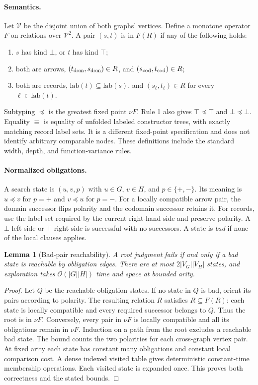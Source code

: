 \documentclass[11pt,letterpaper]{article}
\newtheorem{lemma}[theorem]{Lemma}
\theoremstyle{definition}\newtheorem{definition}[theorem]{Definition}
\newcommand{\Sub}{\ensuremath{\preceq}}
\newcommand{\eqt}{\ensuremath{\equiv}}
\newcommand{\size}[1]{\lvert#1\rvert}
\newcommand{\Oh}{\mathcal O}
\begin{document}
\paragraph{Semantics.}
Let $\mathcal V$ be the disjoint union of both graphs' vertices. Define a monotone operator $F$ on relations over $\mathcal V^2$. A pair $(s,t)$ is in $F(R)$ if any of the following holds:
\begin{enumerate}
\item $s$ has kind $\bot$, or $t$ has kind $\top$;
\item both are arrows, $(t_{\rm dom},s_{\rm dom})\in R$, and $(s_{\rm cod},t_{\rm cod})\in R$;
\item both are records, $\mathrm{lab}(t)\subseteq\mathrm{lab}(s)$, and $(s_\ell,t_\ell)\in R$ for every $\ell\in\mathrm{lab}(t)$.
\end{enumerate}
Subtyping $\Sub$ is the greatest fixed point $\nu F$. Rule 1 also gives $\top\Sub\top$ and $\bot\Sub\bot$. Equality $\eqt$ is equality of unfolded labeled constructor trees, with exactly matching record label sets. It is a different fixed-point specification and does not identify arbitrary comparable nodes. These definitions include the standard width, depth, and function-variance rules.

\paragraph{Normalized obligations.}
A search state is $(u,v,p)$ with $u\in G$, $v\in H$, and $p\in\{+,-\}$. Its meaning is $u\Sub v$ for $p=+$ and $v\Sub u$ for $p=-$. For a locally compatible arrow pair, the domain successor flips polarity and the codomain successor retains it. For records, use the label set required by the current right-hand side and preserve polarity. A $\bot$ left side or $\top$ right side is successful with no successors. A state is \emph{bad} if none of the local clauses applies.

\begin{lemma}[Bad-pair reachability]\label{lem:product}
A root judgment fails if and only if a bad state is reachable by obligation edges. There are at most $2\size{V_G}\size{V_H}$ states, and exploration takes $\Oh(\size G\size H)$ time and space at bounded arity.
\end{lemma}
\begin{proof}
Let $Q$ be the reachable obligation states. If no state in $Q$ is bad, orient its pairs according to polarity. The resulting relation $R$ satisfies $R\subseteq F(R)$: each state is locally compatible and every required successor belongs to $Q$. Thus the root is in $\nu F$. Conversely, every pair in $\nu F$ is locally compatible and all its obligations remain in $\nu F$. Induction on a path from the root excludes a reachable bad state. The bound counts the two polarities for each cross-graph vertex pair. At fixed arity each state has constant many obligations and constant local comparison cost. A dense indexed visited table gives deterministic constant-time membership operations. Each visited state is expanded once. This proves both correctness and the stated bounds.
\end{proof}
\end{document}
